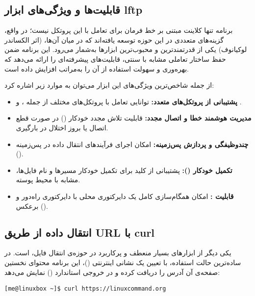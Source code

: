 \subsection{قابلیت‌ها و ویژگی‌های ابزار lftp}

برنامه  تنها کلاینت مبتنی بر خط فرمان برای تعامل با این پروتکل نیست؛ در واقع، گزینه‌های متعددی در این حوزه توسعه یافته‌اند که در میان آن‌ها،  (اثر الکساندر لوکیانوف) یکی از قدرتمندترین و محبوب‌ترین ابزارها به‌شمار می‌رود. این برنامه ضمن حفظ ساختار تعاملی مشابه با  سنتی، قابلیت‌های پیشرفته‌ای را ارائه می‌دهد که بهره‌وری و سهولت استفاده از آن را به‌مراتب افزایش داده است.

از جمله شاخص‌ترین ویژگی‌های این ابزار می‌توان به موارد زیر اشاره کرد:

\begin{itemize}
  \item \textbf{پشتیبانی از پروتکل‌های متعدد:} توانایی تعامل با پروتکل‌های مختلف از جمله ،  و .
  \item \textbf{مدیریت هوشمند خطا و اتصال مجدد:} قابلیت تلاش مجدد خودکار () در صورت قطع اتصال یا بروز اختلال در بارگیری.
  \item \textbf{چندوظیفگی و پردازش پس‌زمینه:} امکان اجرای فرآیندهای انتقال داده در پس‌زمینه ().
  \item \textbf{تکمیل خودکار ():} پشتیبانی از کلید  برای تکمیل خودکار مسیرها و نام فایل‌ها، مشابه با محیط پوسته.
  \item \textbf{قابلیت :} امکان همگام‌سازی کامل یک دایرکتوری محلی با دایرکتوری راه‌دور و برعکس ().
\end{itemize}

\subsection{انتقال داده از طریق URL با curl}

یکی دیگر از ابزارهای بسیار منعطف و پرکاربرد در حوزه‌ی انتقال فایل،  است. در ساده‌ترین حالت استفاده، با تعیین یک نشانی اینترنتی ()، این برنامه محتوای نخستین صفحه‌ی آن آدرس را دریافت کرده و در خروجی استاندارد () نمایش می‌دهد:

\begin{latin}
\begin{lstlisting}
[me@linuxbox ~]$ curl https://linuxcommand.org
\end{lstlisting}
\end{latin}

